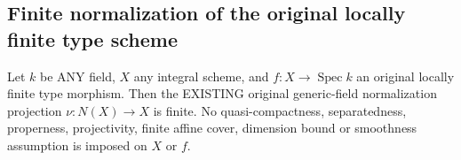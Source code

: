 \subsection{Finite normalization of the original locally finite type scheme}
\begin{theorem}
\label{thm:actual-scheme-normalization-finite}
\leanok
{}
Let $k$ be ANY field, $X$ any integral scheme, and $f:X\to\operatorname{Spec}k$ an original locally finite type morphism. Then the EXISTING original generic-field normalization projection $\nu:N(X)\to X$ is finite. No quasi-compactness, separatedness, properness, projectivity, finite affine cover, dimension bound or smoothness assumption is imposed on $X$ or $f$.
\end{theorem}
